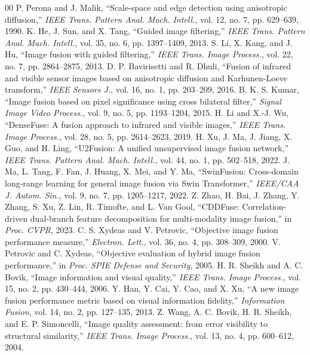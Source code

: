 \documentclass[conference]{IEEEtran}
\begin{document}
\begin{thebibliography}{00}
 P. Perona and J. Malik, ``Scale-space and edge detection using anisotropic diffusion,'' \textit{IEEE Trans. Pattern Anal. Mach. Intell.}, vol. 12, no. 7, pp. 629--639, 1990.
 K. He, J. Sun, and X. Tang, ``Guided image filtering,'' \textit{IEEE Trans. Pattern Anal. Mach. Intell.}, vol. 35, no. 6, pp. 1397--1409, 2013.
 S. Li, X. Kang, and J. Hu, ``Image fusion with guided filtering,'' \textit{IEEE Trans. Image Process.}, vol. 22, no. 7, pp. 2864--2875, 2013.
 D. P. Bavirisetti and R. Dhuli, ``Fusion of infrared and visible sensor images based on anisotropic diffusion and Karhunen-Loeve transform,'' \textit{IEEE Sensors J.}, vol. 16, no. 1, pp. 203--209, 2016.
 B. K. S. Kumar, ``Image fusion based on pixel significance using cross bilateral filter,'' \textit{Signal Image Video Process.}, vol. 9, no. 5, pp. 1193--1204, 2015.
 H. Li and X.-J. Wu, ``DenseFuse: A fusion approach to infrared and visible images,'' \textit{IEEE Trans. Image Process.}, vol. 28, no. 5, pp. 2614--2623, 2019.
 H. Xu, J. Ma, J. Jiang, X. Guo, and H. Ling, ``U2Fusion: A unified unsupervised image fusion network,'' \textit{IEEE Trans. Pattern Anal. Mach. Intell.}, vol. 44, no. 1, pp. 502--518, 2022.
 J. Ma, L. Tang, F. Fan, J. Huang, X. Mei, and Y. Ma, ``SwinFusion: Cross-domain long-range learning for general image fusion via Swin Transformer,'' \textit{IEEE/CAA J. Autom. Sin.}, vol. 9, no. 7, pp. 1205--1217, 2022.
 Z. Zhao, H. Bai, J. Zhang, Y. Zhang, S. Xu, Z. Lin, R. Timofte, and L. Van Gool, ``CDDFuse: Correlation-driven dual-branch feature decomposition for multi-modality image fusion,'' in \textit{Proc. CVPR}, 2023.
 C. S. Xydeas and V. Petrovic, ``Objective image fusion performance measure,'' \textit{Electron. Lett.}, vol. 36, no. 4, pp. 308--309, 2000.
 V. Petrovic and C. Xydeas, ``Objective evaluation of hybrid image fusion performance,'' in \textit{Proc. SPIE Defense and Security}, 2005.
 H. R. Sheikh and A. C. Bovik, ``Image information and visual quality,'' \textit{IEEE Trans. Image Process.}, vol. 15, no. 2, pp. 430--444, 2006.
 Y. Han, Y. Cai, Y. Cao, and X. Xu, ``A new image fusion performance metric based on visual information fidelity,'' \textit{Information Fusion}, vol. 14, no. 2, pp. 127--135, 2013.
 Z. Wang, A. C. Bovik, H. R. Sheikh, and E. P. Simoncelli, ``Image quality assessment: from error visibility to structural similarity,'' \textit{IEEE Trans. Image Process.}, vol. 13, no. 4, pp. 600--612, 2004.

\end{thebibliography}
\end{document}
